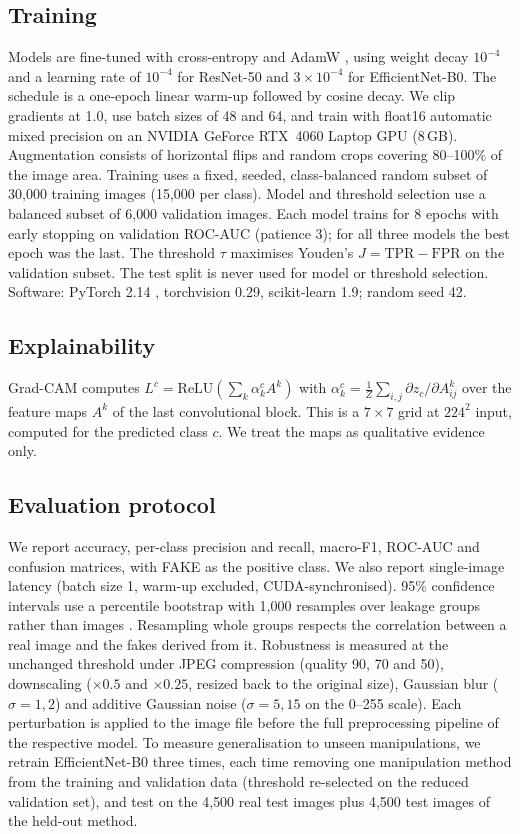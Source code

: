 \documentclass[conference]{IEEEtran}
\begin{document}
\subsection{Training}\label{sec:training}
Models are fine-tuned with cross-entropy and AdamW \cite{loshchilov2019adamw}, using weight decay $10^{-4}$ and a learning rate of $10^{-4}$ for ResNet-50 and $3{\times}10^{-4}$ for EfficientNet-B0. The schedule is a one-epoch linear warm-up followed by cosine decay. We clip gradients at 1.0, use batch sizes of 48 and 64, and train with float16 automatic mixed precision on an NVIDIA GeForce RTX~4060 Laptop GPU (8\,GB). Augmentation consists of horizontal flips and random crops covering 80--100\% of the image area. Training uses a fixed, seeded, class-balanced random subset of 30{,}000 training images (15{,}000 per class). Model and threshold selection use a balanced subset of 6{,}000 validation images. Each model trains for 8 epochs with early stopping on validation ROC-AUC (patience 3); for all three models the best epoch was the last. The threshold $\tau$ maximises Youden's $J=\mathrm{TPR}-\mathrm{FPR}$ \cite{youden1950index} on the validation subset. The test split is never used for model or threshold selection. Software: PyTorch 2.14 \cite{paszke2019pytorch}, torchvision 0.29, scikit-learn 1.9; random seed 42.

\subsection{Explainability}
Grad-CAM \cite{selvaraju2017gradcam} computes $L^c=\mathrm{ReLU}(\sum_k\alpha_k^cA^k)$ with $\alpha_k^c=\frac{1}{Z}\sum_{i,j}\partial z_c/\partial A^k_{ij}$ over the feature maps $A^k$ of the last convolutional block. This is a $7\times7$ grid at $224^2$ input, computed for the predicted class $c$. We treat the maps as qualitative evidence only.

\subsection{Evaluation protocol}
We report accuracy, per-class precision and recall, macro-F1, ROC-AUC and confusion matrices, with FAKE as the positive class. We also report single-image latency (batch size 1, warm-up excluded, CUDA-synchronised). 95\% confidence intervals use a percentile bootstrap with 1{,}000 resamples over leakage groups rather than images \cite{efron1993bootstrap}. Resampling whole groups respects the correlation between a real image and the fakes derived from it. Robustness is measured at the unchanged threshold under JPEG compression (quality 90, 70 and 50), downscaling ($\times0.5$ and $\times0.25$, resized back to the original size), Gaussian blur ($\sigma=1,2$) and additive Gaussian noise ($\sigma=5,15$ on the 0--255 scale). Each perturbation is applied to the image file before the full preprocessing pipeline of the respective model. To measure generalisation to unseen manipulations, we retrain EfficientNet-B0 three times, each time removing one manipulation method from the training and validation data (threshold re-selected on the reduced validation set), and test on the 4{,}500 real test images plus 4{,}500 test images of the held-out method.
\end{document}
